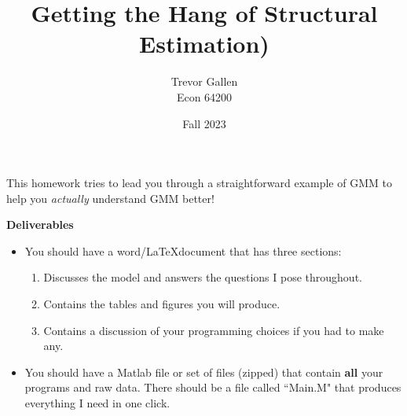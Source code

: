 \documentclass[11pt]{article}
\title{Getting the Hang of Structural Estimation)  }
\author{ Trevor Gallen \\ Econ 64200 }
\date{Fall 2023}
\begin{document}


\maketitle

This homework tries to lead you through a straightforward example of GMM to help you \emph{actually} understand GMM better!  


\textbf{Deliverables}
\begin{itemize}
\item You should have a word/\LaTeX document that has three sections: 
\begin{enumerate}
\item Discusses the model and answers the questions I pose throughout.
\item Contains the tables and figures you will produce.
\item Contains a discussion of your programming choices if you had to make any.
\end{enumerate}
\item You should have a Matlab file or set of files (zipped) that contain \textbf{all} your programs and raw data.  There should be a file called ``Main.M" that produces everything I need in one click.
\end{itemize}
\end{document}
